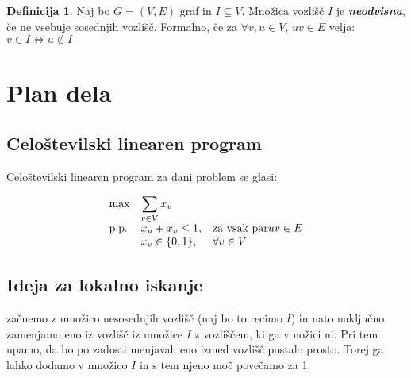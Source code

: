 \documentclass[a4paper, 12 pt]{article}
\theoremstyle{plain}
\theoremstyle{definition}
\newtheorem{definicija}{Definicija}
\begin{document}
\begin{definicija}Naj bo $G = (V, E)$ graf in $I \subseteq V$. Množica vozlišč $I$ je \textbf{\textit{neodvisna}}, če ne vsebuje sosednjih vozlišč. 
\newline Formalno, če za $\forall v, u \in V$, $uv \in E$ velja: $v \in I \Leftrightarrow  u \notin I$ \end{definicija}



\section{Plan dela}
\subsection{Celoštevilski linearen program}
Celoštevilski linearen program za dani problem se glasi:


\begin{equation*}
\begin{array}{ll@{}ll}
\text{max}  & \displaystyle\sum\limits_{v\in V} x_v &&\\
\text{p.p.}	 & x_u + x_v \leq 1,		 			&&\text{za vsak par} uv \in E \\
                 & x_v \in \{0,1\}, 	              			&&\forall v \in V
\end{array}
\end{equation*}



\subsection{Ideja za lokalno iskanje}
začnemo z množico nesosednjih vozlišč (naj bo to recimo $I$) in nato naključno zamenjamo eno iz vozlišč iz množice $I$ z vozliščem, ki ga v nožici ni. Pri tem upamo, da bo po zadosti menjavah eno izmed vozlišč postalo prosto. Torej ga lahko dodamo v množico $I$ in s tem njeno moč povečamo za 1.
\end{document}
